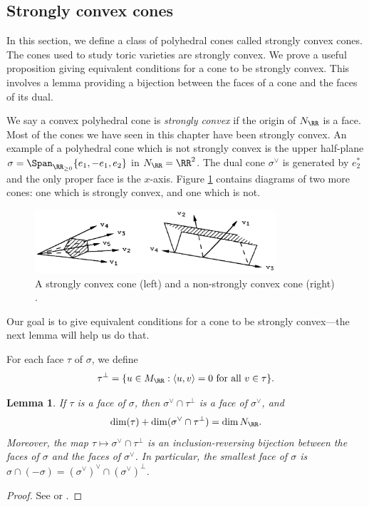 \documentclass[12pt]{amsart}
\theoremstyle{plain}
\newtheorem{lemma}[theorem]{Lemma}
\begin{document}
\subsection{Strongly convex cones}
In this section, we define a class of polyhedral cones called strongly convex cones.
The cones used to study toric varieties are strongly convex.
We prove a useful proposition giving equivalent conditions for a cone to be strongly convex.
This involves a lemma providing a bijection between the faces of a cone and the faces of its dual.

We say a convex polyhedral cone is \emph{strongly convex} if the origin of $N_\RR$ is a face.
Most of the cones we have seen in this chapter have been strongly convex.
An example of a polyhedral cone which is not strongly convex is the upper half-plane $\sigma = \Span_{\RR_{\ge 0}}\{e_1, -e_1, e_2\}$ in $N_\RR=\RR^2$.
The dual cone $\sigma^\vee$ is generated by $e_2^*$ and the only proper face is the $x$-axis.
Figure \ref{figure:strongconvexity} contains diagrams of two more cones: one which is strongly convex, and one which is not.

\begin{figure}[h]
\centering
\includegraphics[width=0.8\textwidth]{../images/fultons_cones}
\caption{A strongly convex cone (left) and a non-strongly convex cone (right) \cite{Fulton93}.}
\label{figure:strongconvexity}
\end{figure}

Our goal is to give equivalent conditions for a cone to be strongly convex---the next lemma will help us do that.

For each face $\tau$ of $\sigma$, we define
$$\tau^\perp = \{u \in M_\RR : \langle u, v \rangle = 0 \text{ for all } v \in \tau\}.$$

\begin{lemma}\label{lemma:dualfaces}
If $\tau$ is a face of $\sigma$, then $\sigma^\vee \cap \tau^\perp$ is a face of $\sigma^\vee$, and
$$\dim(\tau) + \dim(\sigma^\vee \cap \tau^\perp) = \dim N_\RR.$$
Moreover, the map $\tau \mapsto \sigma^\vee \cap \tau^\perp$ is an inclusion-reversing bijection between the faces of $\sigma$ and the faces of $\sigma^\vee$.
In particular, the smallest face of $\sigma$ is $\sigma \cap (-\sigma) = (\sigma^\vee)^\vee \cap (\sigma^\vee)^\perp$.
\end{lemma}
\begin{proof}
See \cite[\S 1.2]{Fulton93} or \cite[\S 1]{Zaman13}.
\end{proof}
\end{document}
